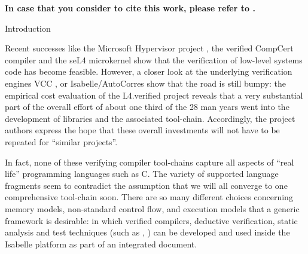 \begin{isabellebody}
\begin{isamarkuptext*}
  \textbf{In case that you consider to cite this work, please refer to \cite{Tuong-IsabelleC:2019}.}%
\end{isamarkuptext*}\isamarkuptrue%
%
\begin{isamarkupsection*}%
[label = {intro},type = {scholarly_paper.introduction}, args={label = {intro},type = {scholarly_paper.introduction}, Isa_COL.text_element.level = {}, Isa_COL.text_element.referentiable = {False}, Isa_COL.text_element.variants = {{STR ''outline'', STR ''document''}}, scholarly_paper.text_section.main_author = {}, scholarly_paper.text_section.fixme_list = {}, Isa_COL.text_element.level = {}}]Introduction%
\end{isamarkupsection*}\isamarkuptrue%
%
\begin{isamarkuptext*}%
[label = {introtext},type = {scholarly_paper.introduction}, args={label = {introtext},type = {scholarly_paper.introduction}, Isa_COL.text_element.level = {}, Isa_COL.text_element.referentiable = {False}, Isa_COL.text_element.variants = {{STR ''outline'', STR ''document''}}, scholarly_paper.text_section.main_author = {}, scholarly_paper.text_section.fixme_list = {}, Isa_COL.text_element.level = {}}]\noindent{}Recent successes like the Microsoft Hypervisor project \cite{DBLP:conf/fm/LeinenbachS09},
the verified CompCert compiler \cite{DBLP:journals/cacm/Leroy09}
and the seL4 microkernel \cite{DBLP:conf/sosp/KleinEHACDEEKNSTW09,DBLP:journals/tocs/KleinAEMSKH14} 
show that the verification of low-level systems code has become feasible.
However, a closer look at the underlying verification engines  
VCC \cite{DBLP:conf/tphol/CohenDHLMSST09}, 
or Isabelle/AutoCorres \cite{DBLP:conf/pldi/GreenawayLAK14}
show that the road is still bumpy: the  empirical cost evaluation  of the L4.verified project 
\cite{DBLP:journals/tocs/KleinAEMSKH14} reveals that a very substantial part  of the overall 
effort of about one third of the 28 man years went into the development of libraries and the 
associated tool-chain. Accordingly, the project authors \cite{DBLP:journals/tocs/KleinAEMSKH14} 
express the hope that these overall investments will not have to be repeated for 
``similar projects''.

In fact, none of these verifying compiler tool-chains capture all aspects of ``real life'' 
programming languages such as C. The variety of supported language fragments seem to contradict 
the assumption that we will all converge to one comprehensive tool-chain soon. There are so many 
different choices concerning memory models, non-standard control flow, and execution models 
that a generic framework is desirable: in which verified compilers, deductive verification, 
static analysis and test techniques (such as \cite{DBLP:conf/tap/Keller18}, 
\cite{DBLP:conf/itp/AissatVW16}) can be developed and used inside the Isabelle platform
as part of an integrated document.


\end{isamarkuptext*}
\end{isabellebody}
